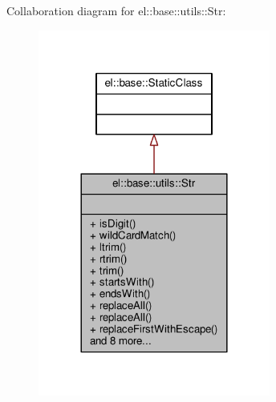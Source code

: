Collaboration diagram for el\+:\+:base\+:\+:utils\+:\+:Str\+:
\nopagebreak
\begin{figure}[H]
\begin{center}
\leavevmode
\includegraphics[width=216pt]{dd/d07/classel_1_1base_1_1utils_1_1Str__coll__graph}
\end{center}
\end{figure}
